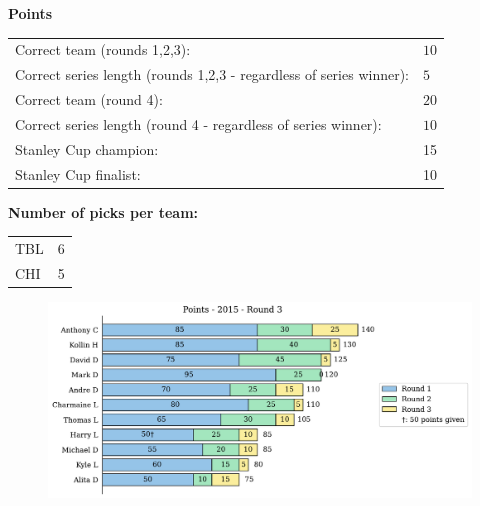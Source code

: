 \documentclass[10pt]{article}
\begin{document}
{\bf Points}\\
\begin{minipage}{12cm}
    \begin{tabular}{l l}
        Correct team (rounds 1,2,3):	& $10$\\
        Correct series length (rounds 1,2,3 - regardless of series winner):	& $5$\\
        Correct team (round 4):	& $20$\\
        Correct series length (round 4 - regardless of series winner):	& $10$\\
        Stanley Cup champion:	& 15\\
        Stanley Cup finalist:	& 10\\
    \end{tabular}

    \vspace{1cm}
    {\bf Number of picks per team:}\\
    \begin{tabular}{lc }
        TBL & 6 \\
        CHI & 5 \\
    \end{tabular}
\end{minipage}
\begin{minipage}[t]{13cm}
    \begin{figure}[H]
        \vspace{-2.5cm}
        \includegraphics[width=13cm]{../../figures/2015/Points-2015-Round3.pdf}
    \end{figure}
\end{minipage}
\end{document}
